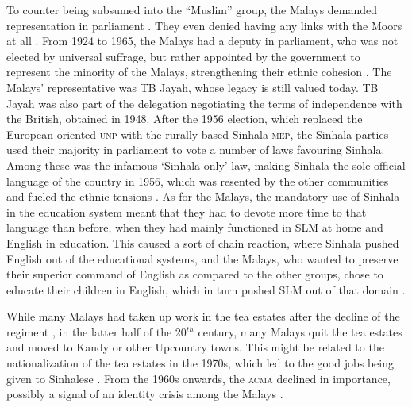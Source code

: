 To counter being subsumed into the ``Muslim'' group, the Malays demanded representation in  parliament  \citep[15f]{Hussainmiya1987}. They even denied having any links with the Moors at all  \citep[19]{Hussainmiya1987}.
From 1924 to 1965, the Malays had a deputy  in parliament, who was not elected by universal suffrage, but rather appointed by the government to represent the minority of the Malays, strengthening their ethnic cohesion \citep[20]{Hussainmiya1987}. The Malays' representative was TB Jayah, whose legacy is still valued today. TB Jayah was also part of the delegation negotiating the terms of independence with the British, obtained in  1948. After the 1956 election, which replaced the European-oriented \textsc{unp} with the rurally based Sinhala \textsc{mep}, the Sinhala parties used their majority in parliament to vote a number of laws favouring Sinhala. Among these was  the infamous `Sinhala only' law, making Sinhala the sole official language of the country in 1956, which was resented by the other communities and fueled the ethnic tensions \citep[35]{NissanEtAl1990}. As for the Malays, the mandatory use of Sinhala in the education system meant that they had to devote more time to that language than before, when they had mainly functioned in SLM at home and English in education. This caused a sort of chain reaction, where Sinhala pushed English out of the educational systems, and the Malays, who wanted to preserve their superior command of English as compared to the other groups, chose to educate their children in English, which in turn pushed SLM out of that domain \citep{Bichsel,Saldin2001,AnsaldoEtAl2006fel,LimEtAl2007}.

While many Malays had taken up work in the tea estates after the decline of the regiment  \citep[39]{Saldin2003}, in the latter half of the 20$^{th}$ century, many Malays quit the tea estates and moved to Kandy or other Upcountry towns. This might be related to the nationalization of the tea estates in the 1970s, which led to the good jobs being given to Sinhalese \citep[37]{NissanEtAl1990}. From the 1960s onwards, the \textsc{acma} declined in importance, possibly a signal of an identity crisis among the Malays \citep[21]{Hussainmiya1987}.

